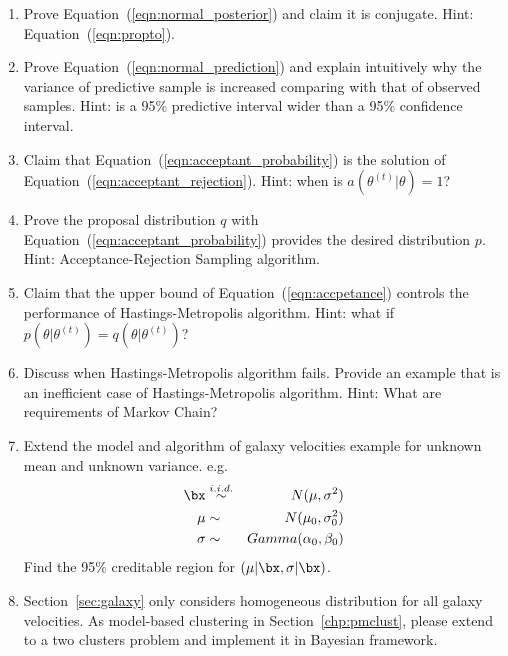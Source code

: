 \begin{enumerate}[label=\thechapter-\arabic*]

\item
Prove Equation~(\ref{eqn:normal_posterior}) and claim it is conjugate.
{\color{blue} Hint: Equation~(\ref{eqn:propto}). }

\item
Prove Equation~(\ref{eqn:normal_prediction}) and explain intuitively why
the variance of predictive sample is increased comparing with that of
observed samples.
{\color{blue} Hint: is a 95\% predictive interval wider than a 95\% confidence
interval. }

\item
Claim that Equation~(\ref{eqn:acceptant_probability}) is the solution of
Equation~(\ref{eqn:acceptant_rejection}).
{\color{blue} Hint: when is $a(\theta^{(t)} | \theta) = 1$? }

\item
Prove the proposal distribution $q$ with
Equation~(\ref{eqn:acceptant_probability}) provides the desired
distribution $p$.
{\color{blue} Hint: Acceptance-Rejection Sampling algorithm. }

\item
Claim that the upper bound of Equation~(\ref{eqn:accpetance}) controls
the performance of Hastings-Metropolis algorithm.
{\color{blue} Hint: what if
$p(\theta | \theta^{(t)}) = q(\theta | \theta^{(t)})$? }

\item
Discuss when Hastings-Metropolis algorithm fails. Provide an example
that is an inefficient case of Hastings-Metropolis algorithm.
{\color{blue} Hint: What are requirements of Markov Chain? }

\item
Extend the model and algorithm of galaxy velocities example
for unknown mean and unknown variance. e.g.
\begin{eqnarray*}
\bx & \stackrel{i.i.d.}{\sim} & N(\mu, \sigma^2) \\
\mu & \sim & N(\mu_0, \sigma_0^2) \\
\sigma & \sim & Gamma(\alpha_0, \beta_0)
\end{eqnarray*}
Find the 95\% creditable region for $(\mu|\bx, \sigma|\bx)$.

\item
Section~\ref{sec:galaxy} only considers homogeneous distribution for all
galaxy velocities. As model-based clustering in Section~\ref{chp:pmclust},
please extend to a two clusters problem and implement it in Bayesian
framework.

\end{enumerate}

